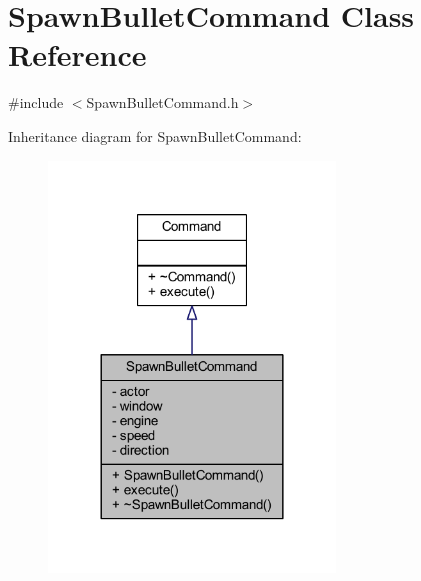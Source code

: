 \hypertarget{class_spawn_bullet_command}{}\section{Spawn\+Bullet\+Command Class Reference}
\label{class_spawn_bullet_command}


{\ttfamily \#include $<$Spawn\+Bullet\+Command.\+h$>$}



Inheritance diagram for Spawn\+Bullet\+Command\+:
\nopagebreak
\begin{figure}[H]
\begin{center}
\leavevmode
\includegraphics[width=216pt]{class_spawn_bullet_command__inherit__graph}
\end{center}
\end{figure}


